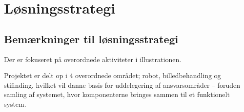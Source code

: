 \section{Løsningsstrategi}
\subsection{Bemærkninger til løsningsstrategi}
Der er fokuseret på overordnede aktiviteter i illustrationen.

Projektet er delt op i 4 overordnede området; robot, billedbehandling og stifinding, hvilket vil danne basis for uddelegering af ansvarsområder -- foruden samling af systemet, hvor komponenterne bringes sammen til et funktionelt system.
